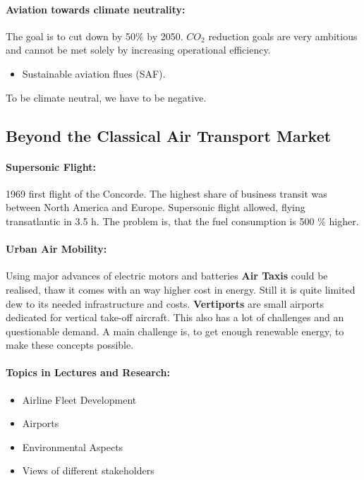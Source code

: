 \documentclass[twocolumn]{article}
\begin{document}
			\paragraph{Aviation towards climate neutrality:}
				The goal is to cut down by 50\% by 2050. ${CO_2}$ reduction goals are very ambitious and cannot be met solely by increasing operational efficiency.
				\begin{itemize}%
				\renewcommand{\labelitemi}{$\Rightarrow$}
				\item Sustainable aviation flues (SAF).
				\end{itemize}
				To be climate neutral, we have to be negative. 

		\subsection{Beyond the Classical Air Transport Market}
			\paragraph{Supersonic Flight:}
				1969 first flight of the Concorde. The highest share of business transit was between North America and Europe. Supersonic flight allowed, flying transatlantic in 3.5 h. The problem is, that the fuel consumption is 500 \% higher.
			\paragraph{Urban Air Mobility:}
				Using major advances of electric motors and batteries \textbf{Air Taxis} could be realised, thaw it comes with an way higher cost in energy. Still it is quite limited dew to its needed infrastructure and costs. \textbf{Vertiports} are small airports dedicated for vertical take-off aircraft. This also has a lot of challenges and an questionable demand. A main challenge is, to get enough renewable energy, to make these concepts possible.
			\paragraph{Topics in Lectures and Research:}
				\begin{itemize}
				\item Airline Fleet Development
				\item Airports
				\item Environmental Aspects
				\item Views of different stakeholders
				\end{itemize}
\end{document}
